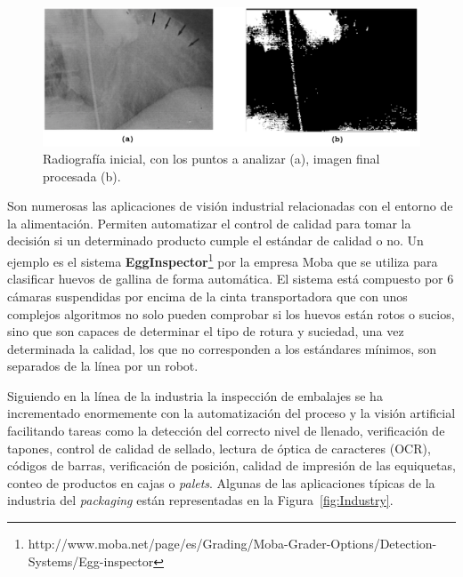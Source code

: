 \begin{figure}[th]
\centering
\includegraphics[scale=0.4]{Figures/medicine.png}
\decoRule
\caption[Aplicaciones de radiografía en medicina]{Radiografía inicial, con los puntos a analizar (a), imagen final procesada (b).}
\label{fig:Medicine}
\end{figure}

Son numerosas las aplicaciones de visión industrial relacionadas con el entorno de la alimentación. Permiten automatizar el control de calidad para tomar la decisión si un determinado producto cumple el estándar de calidad o no. Un ejemplo es el sistema \textbf{EggInspector}\footnote{http://www.moba.net/page/es/Grading/Moba-Grader-Options/Detection-Systems/Egg-inspector} por la empresa Moba que se utiliza para clasificar huevos de gallina de forma automática. El sistema está compuesto por 6 cámaras suspendidas por encima de la cinta transportadora que con unos complejos algoritmos no solo pueden comprobar si los huevos están rotos o sucios, sino que son capaces de determinar el tipo de rotura y suciedad, una vez determinada la calidad, los que no corresponden a los estándares mínimos, son separados de la línea por un robot.

Siguiendo en la línea de la industria la inspección de embalajes se ha incrementado enormemente con la automatización del proceso y la visión artificial facilitando tareas como la detección del correcto nivel de llenado, verificación de tapones, control de calidad de sellado, lectura de óptica de caracteres (OCR), códigos de barras, verificación de posición, calidad de impresión de las equiquetas, conteo de productos en cajas o \textit{palets}. Algunas de las aplicaciones típicas de la industria del \textit{packaging} están representadas en la Figura~\ref{fig:Industry}.

